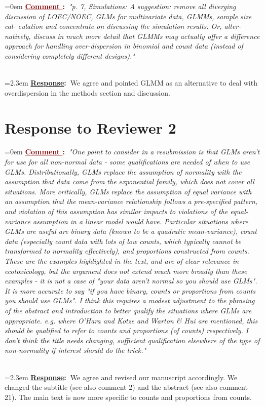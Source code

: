 \documentclass[12pt]{article}
\newcounter{cN}
\newcommand{\comment}[1]{
	\vspace{2em} 
	\refstepcounter{cN} %
	\noindent \hangindent=0em \textbf{\textcolor{Maroon}{\uline{Comment \thecN}:~}}\emph{"#1"}
	}
\newcommand{\response}[1]{
	\\[0.25em] 
	\hangindent=2.3em \textbf{\textcolor{NavyBlue}{\uline{Response}:~}}#1 
	}
\begin{document}
\comment{p. 7, Simulations: A suggestion: remove all diverging discussion of
LOEC/NOEC, GLMs for multivariate data, GLMMs, sample size cal-
culation and concentrate on discussing the simulation results. Or, alter-
natively, discuss in much more detail that GLMMs may actually offer a
difference approach for handling over-dispersion in binomial and count
data (instead of considering completely different designs).}
\response{We agree and pointed GLMM as an alternative to deal with overdispersion in the methods section and discussion.}




\section{Response to Reviewer 2}
\vspace{-2em}

\comment{One point to consider in a resubmission is that GLMs aren't for use for all non-normal data - some qualifications are needed of when to use GLMs.  Distributionally, GLMs replace the assumption of normality with the assumption that data come from the exponential family, which does not cover all situations.  More critically, GLMs replace the assumption of equal variance with an assumption that the mean-variance relationship follows a pre-specified pattern, and violation of this assumption has similar impacts to violations of the equal-variance assumption in a linear model would have.  Particular situations where GLMs are useful are binary data (known to be a quadratic mean-variance), count data (especially count data with lots of low counts, which typically cannot be transformed to normality effectively), and proportions constructed from counts.  These are the examples highlighted in the text, and are of clear relevance in ecotoxicology, but the argument does not extend much
more broadly than these examples - it is not a case of "your data aren't normal so you should use GLMs".  It is more accurate to say "if you have binary, counts or proportions from counts you should use GLMs".  I think this requires a modest adjustment to the phrasing of the abstract and introduction to better qualify the situations where GLMs are appropriate.  e.g. where O'Hara and Kotze and Warton \& Hui are mentioned, this should be qualified to refer to counts and proportions (of counts) respectively.  I  don't think the title needs changing, sufficient qualification elsewhere of the type of non-normality if interest should do the trick.}
\response{We agree and revised our manuscript accordingly. We changed the subtitle (see also comment 2) and the abstract (see also comment 21). The main text is now more specific to counts and proportions from counts.}
\end{document}
